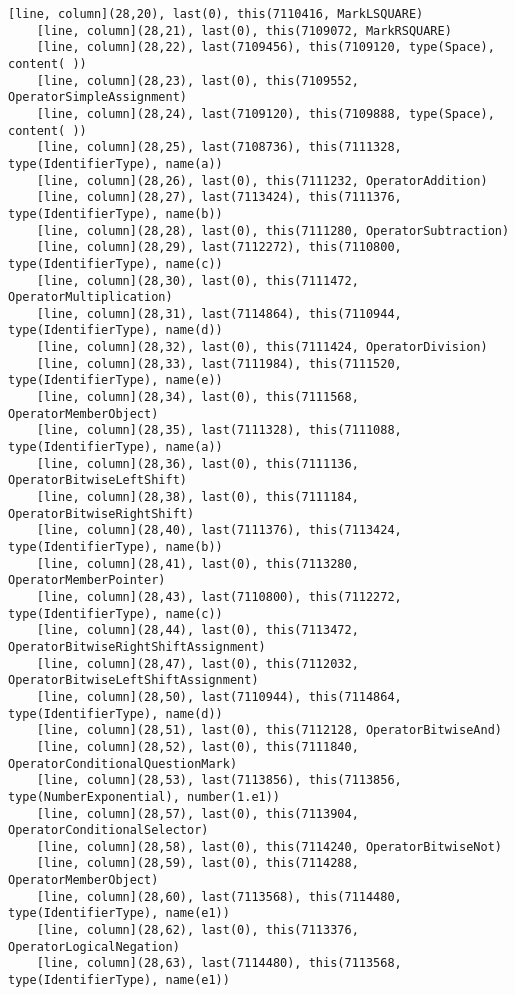 \documentclass[UTF8]{ctexart}
\begin{document}
{\begin{lstlisting}[language={[ANSI]C++}]
    [line, column](28,20), last(0), this(7110416, MarkLSQUARE)
    [line, column](28,21), last(0), this(7109072, MarkRSQUARE)
    [line, column](28,22), last(7109456), this(7109120, type(Space), content( ))
    [line, column](28,23), last(0), this(7109552, OperatorSimpleAssignment)
    [line, column](28,24), last(7109120), this(7109888, type(Space), content( ))
    [line, column](28,25), last(7108736), this(7111328, type(IdentifierType), name(a))
    [line, column](28,26), last(0), this(7111232, OperatorAddition)
    [line, column](28,27), last(7113424), this(7111376, type(IdentifierType), name(b))
    [line, column](28,28), last(0), this(7111280, OperatorSubtraction)
    [line, column](28,29), last(7112272), this(7110800, type(IdentifierType), name(c))
    [line, column](28,30), last(0), this(7111472, OperatorMultiplication)
    [line, column](28,31), last(7114864), this(7110944, type(IdentifierType), name(d))
    [line, column](28,32), last(0), this(7111424, OperatorDivision)
    [line, column](28,33), last(7111984), this(7111520, type(IdentifierType), name(e))
    [line, column](28,34), last(0), this(7111568, OperatorMemberObject)
    [line, column](28,35), last(7111328), this(7111088, type(IdentifierType), name(a))
    [line, column](28,36), last(0), this(7111136, OperatorBitwiseLeftShift)
    [line, column](28,38), last(0), this(7111184, OperatorBitwiseRightShift)
    [line, column](28,40), last(7111376), this(7113424, type(IdentifierType), name(b))
    [line, column](28,41), last(0), this(7113280, OperatorMemberPointer)
    [line, column](28,43), last(7110800), this(7112272, type(IdentifierType), name(c))
    [line, column](28,44), last(0), this(7113472, OperatorBitwiseRightShiftAssignment)
    [line, column](28,47), last(0), this(7112032, OperatorBitwiseLeftShiftAssignment)
    [line, column](28,50), last(7110944), this(7114864, type(IdentifierType), name(d))
    [line, column](28,51), last(0), this(7112128, OperatorBitwiseAnd)
    [line, column](28,52), last(0), this(7111840, OperatorConditionalQuestionMark)
    [line, column](28,53), last(7113856), this(7113856, type(NumberExponential), number(1.e1))
    [line, column](28,57), last(0), this(7113904, OperatorConditionalSelector)
    [line, column](28,58), last(0), this(7114240, OperatorBitwiseNot)
    [line, column](28,59), last(0), this(7114288, OperatorMemberObject)
    [line, column](28,60), last(7113568), this(7114480, type(IdentifierType), name(e1))
    [line, column](28,62), last(0), this(7113376, OperatorLogicalNegation)
    [line, column](28,63), last(7114480), this(7113568, type(IdentifierType), name(e1))

\end{lstlisting}}
\end{document}
